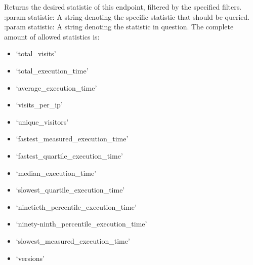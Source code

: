 \documentclass[letterpaper,10pt,english]{sphinxmanual}
\begin{document}
\begin{fulllineitems}

\begin{fulllineitems}
\label{\detokenize{pydash_app.dashboard.endpoint:pydash_app.dashboard.endpoint.Endpoint.statistic}}
Returns the desired statistic of this endpoint, filtered by the specified filters.
:param statistic: A string denoting the specific statistic that should be queried.
:param statistic: A string denoting the statistic in question. The complete amount of allowed statistics is:
\begin{itemize}
\item {} 
‘total\_visits’

\item {} 
‘total\_execution\_time’

\item {} 
‘average\_execution\_time’

\item {} 
‘visits\_per\_ip’

\item {} 
‘unique\_visitors’

\item {} 
‘fastest\_measured\_execution\_time’

\item {} 
‘fastest\_quartile\_execution\_time’

\item {} 
‘median\_execution\_time’

\item {} 
‘slowest\_quartile\_execution\_time’

\item {} 
‘ninetieth\_percentile\_execution\_time’

\item {} 
‘ninety-ninth\_percentile\_execution\_time’

\item {} 
‘slowest\_measured\_execution\_time’

\item {} 
‘versions’


\end{itemize}
\end{fulllineitems}
\end{fulllineitems}
\end{document}
